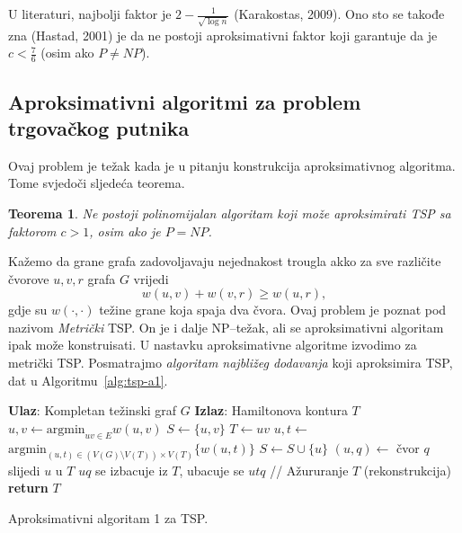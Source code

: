 \documentclass[a4paper, utf8, 11pt, colorlinks]{book}
\newtheorem{thm}{Teorema}[chapter]
\theoremstyle{definition}
\begin{document}
  \noindent U literaturi, najbolji faktor je $2 - \frac{1}{\sqrt{\log n}}$ (Karakostas, 2009).
  Ono sto se takođe zna (Hastad, 2001) je da ne postoji aproksimativni faktor 
  koji garantuje da je $c < \frac{7}{6}$ (osim ako $P \neq NP$). 
  
  \subsection{Aproksimativni algoritmi za problem trgovačkog putnika}
  
  Ovaj problem je težak kada je u pitanju konstrukcija aproksimativnog algoritma. Tome svjedoči sljedeća teorema.
 \begin{thm}
    Ne postoji polinomijalan algoritam koji može aproksimirati TSP sa  faktorom $c > 1$, osim ako je $P = NP$. 
\end{thm}
  Kažemo da grane grafa zadovoljavaju nejednakost trougla akko za sve različite čvorove $u,v, r$ grafa $G$ vrijedi
  $$ w(u,v) + w(v,r) \geq w(u,r),$$
  gdje su $w(\cdot, \cdot)$ težine grane koja spaja dva čvora. Ovaj problem je poznat 
  pod nazivom \emph{Metrički} TSP. On je i dalje NP--težak, ali se aproksimativni algoritam ipak može konstruisati.  U nastavku aproksimativne algoritme izvodimo za metrički  TSP. Posmatrajmo \emph{algoritam najbližeg dodavanja} koji aproksimira TSP, dat u Algoritmu~\ref{alg:tsp-a1}. 
  
   \begin{algorithm}[!t] 
  
  	\begin{algorithmic}[1]
  		\STATE \textbf{Ulaz}: Kompletan težinski graf $G$
  		\STATE \textbf{Izlaz}: Hamiltonova kontura $T$  
  		\STATE $u,v \gets \mbox{argmin}_{uv \in E} w(u,v)$
  		\STATE $S \gets \{u,v\}$
  		\STATE $T \gets uv$
  		\STATE $u,t \gets$ $\mbox{argmin}_{(u,t) \in (V(G)\setminus V(T)) \times V(T)} \{w(u, t)\}$
  		\STATE $ S \gets S \cup \{u\}$ 
  		\STATE $(u, q)\gets$ čvor $q$ slijedi $u$ u  $T$
  		\STATE  $uq$ se izbacuje iz $T$, ubacuje se $utq$  // Ažururanje $T$ (rekonstrukcija)
  		\ENDWHILE
  		\STATE \textbf{return} $T$
  	\end{algorithmic}
   	\caption{Aproksimativni algoritam 1 za TSP.}
   	\label{alg:tsp-a1}
  \end{algorithm}
\end{document}
